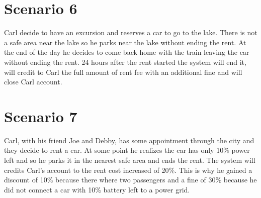 \section{Scenario 6}
Carl decide to have an excursion and reserves a car to go to the lake. There is not a safe area near the lake so he parks near the lake without ending the rent. At the end of the day he decides to come back home with the train leaving the car without ending the rent. 24 hours after the rent started the system will end it, will credit to Carl the full amount of rent fee with an additional fine and will close Carl account.
\section{Scenario 7}
Carl, with his friend Joe and Debby, has some appointment through the city and they decide to rent a car. At some point he realizes the car has only 10\% power left and so he parks it in the nearest safe area and ends the rent. The system will credits Carl's account to the rent cost increased of 20\%. This is why he gained a discount of 10\% because there where two passengers and a fine of 30\% because he did not connect a car with 10\% battery left to a power grid.